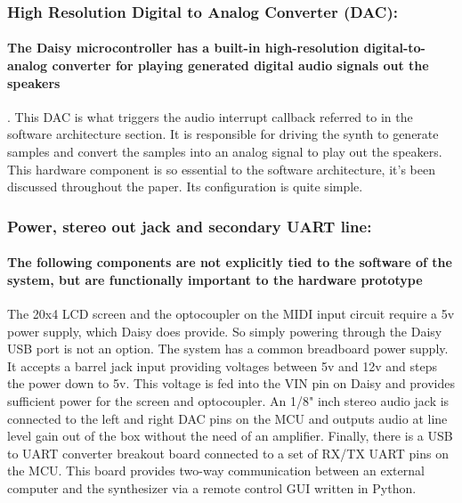\documentclass[acmlarge,screen]{acmart}
\begin{document}
	\subsubsection{High Resolution Digital to Analog Converter (DAC):} 
	\paragraph{The Daisy microcontroller has a built-in high-resolution digital-to-analog converter for playing generated digital audio signals out the speakers}. This DAC is what triggers the audio interrupt callback referred to in the software architecture section. It is responsible for driving the synth to generate samples and convert the samples into an analog signal to play out the speakers. This hardware component is so essential to the software architecture, it's been discussed throughout the paper. Its configuration is quite simple.
	
	\subsubsection{Power, stereo out jack and secondary UART line:}
	\paragraph{The following components are not explicitly tied to the software of the system, but are functionally important to the hardware prototype} The 20x4 LCD screen and the optocoupler on the MIDI input circuit require a 5v power supply, which Daisy does provide. So simply powering through the Daisy USB port is not an option. The system has a common breadboard power supply. It accepts a barrel jack input providing voltages between 5v and 12v and steps the power down to 5v. This voltage is fed into the VIN pin on Daisy and provides sufficient power for the screen and optocoupler. An 1/8" inch stereo audio jack is connected to the left and right DAC pins on the MCU and outputs audio at line level gain out of the box without the need of an amplifier. Finally, there is a USB to UART converter breakout board connected to a set of RX/TX UART pins on the MCU. This board provides two-way communication between an external computer and the synthesizer via a remote control GUI written in Python.
	
\end{document}
